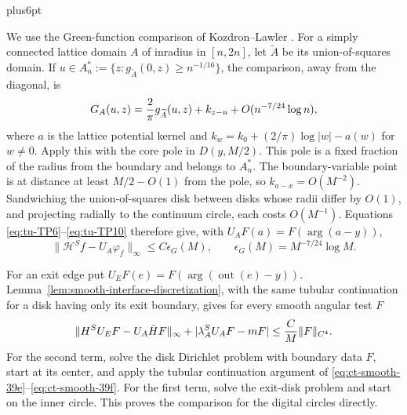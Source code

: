 \documentclass[12pt,reqno]{amsart}
\makeatletter
\theoremstyle{plain}
\theoremstyle{definition}
\theoremstyle{remark}
\renewenvironment{proof}[1][\proofname]{%
  \par
  \pushQED{\qed}%
  \normalfont
  \topsep6pt plus6pt\relax
  \trivlist
  \item[\hskip\labelsep\slshape #1\@addpunct{.}]%
  \ignorespaces
}{%
  \popQED
  \endtrivlist
  \@endpefalse
}
\DeclareRobustCommand{\qed}{%
  \leavevmode\unskip\penalty9999\hbox{}\nobreak
  \ifmmode
    \makebox[0pt][l]{\qquad\hbox{\qedsymbol}}%
  \else
    \qquad\hbox{\qedsymbol}%
  \fi
}
\renewcommand{\qedsymbol}{\rule[.47pt]{4pt}{6pt}}
\numberwithin{equation}{section}
\makeatother
\begin{document}
\begin{proof}[Proof of Lemma~\ref{lem:typed-centered-endpoint-product}]
We use the Green-function comparison of Kozdron--Lawler
\cite[Corollary~3.5, equation~(30)]{KozdronLawler2005}.
For a simply connected lattice domain \(A\) of inradius in \([n,2n]\),
let \(\widetilde A\) be its union-of-squares domain. If
\(u\in A_n^*:=\{z:g_{\widetilde A}(0,z)\ge n^{-1/16}\}\), the
comparison, away from the diagonal, is
\begin{equation}
 G_A(u,z)={2\over\pi}g_{\widetilde A}(u,z)+k_{z-u}
                 +O(n^{-7/24}\log n),                    \label{eq:tu-TP10}
\end{equation}
where \(a\) is the lattice potential kernel and
\(k_w=k_0+(2/\pi)\log|w|-a(w)\) for \(w\ne0\).
Apply this with the core pole in \(D(y,M/2)\). This pole is a fixed
fraction of the radius from the boundary and belongs to \(A_n^*\).
The boundary-variable point is at distance at least \(M/2-O(1)\) from
the pole, so \(k_{a-x}=O(M^{-2})\). Sandwiching the union-of-squares
disk between disks whose radii differ by \(O(1)\), and projecting
radially to the continuum circle, each costs \(O(M^{-1})\).
Equations
\eqref{eq:tu-TP6}--\eqref{eq:tu-TP10} therefore give, with
\(U_AF(a)=F(\arg(a-y))\),
\begin{equation}
 \|\mathcal{H}^Sf-U_A\varphi_f\|_\infty
       \le C\epsilon_G(M),\qquad
 \epsilon_G(M)=M^{-7/24}\log M.                           \label{eq:tu-TP11}
\end{equation}

For an exit edge put \(U_EF(e)=F(\arg(\operatorname{out}(e)-y))\).
Lemma~\ref{lem:smooth-interface-discretization}, with the same tubular
continuation for a disk having only its exit boundary, gives for every
smooth angular test \(F\)
\begin{equation}
 \|H^SU_EF-U_A\bar HF\|_\infty
       +|\lambda_A^SU_AF-mF|
       \le {C\over M}\|F\|_{C^4}.                         \label{eq:tu-TP12}
\end{equation}
For the second term, solve the disk Dirichlet problem with boundary data
\(F\), start at its center, and apply the tubular continuation argument
of \eqref{eq:ct-smooth-39e}--\eqref{eq:ct-smooth-39f}. For the first term, solve the exit-disk problem and
start on the inner circle. This proves the comparison for the digital
circles directly.


\end{proof}
\end{document}
